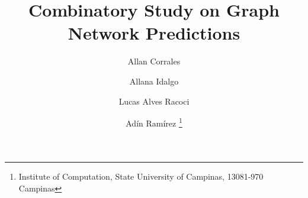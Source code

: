 \documentclass[11pt,twoside]{article}
\begin{document}





\TRMakeCover


%
\pagestyle{myheadings}


\title{Combinatory Study on Graph Network Predictions}

\author{
    Allan Corrales
    \and Allana Idalgo
    \and Lucas Alves Racoci
    \and Adín Ramírez
    \thanks{Institute of Computation, State University of Campinas, 13081-970  Campinas}
}

\date{}

\maketitle








{\small



}


\end{document}
